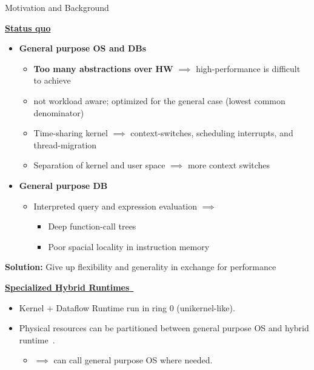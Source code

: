 \begin{block}{Motivation and Background}

\underline{\textbf{Status quo}}
  \begin{itemize}
  \item \textbf{General purpose OS and DBs}%
    \begin{itemize}
     \item \textbf{Too many abstractions over HW} $\implies$ high-performance is difficult
      to achieve~\cite{GICEVA:2016:OS_SUPPORT,HALE:2015:NAUTILUS}
    \item not workload aware; optimized for the general case (lowest common denominator)
    \item Time-sharing kernel $\implies$ context-switches, scheduling interrupts, and thread-migration
    \item Separation of kernel and user space $\implies$ more context switches
    \end{itemize}
  \item \textbf{General purpose DB}
    \begin{itemize}
    \item Interpreted query and expression evaluation  $\implies$
      \begin{itemize}
      \item Deep function-call trees
    \item Poor spacial locality in instruction memory
    \end{itemize}
    \end{itemize}
  \end{itemize}

  \begin{center}
    \alert{\textbf{Solution:} Give up flexibility and generality in exchange for performance}
  \end{center}
   
  \underline{\textbf{Specialized Hybrid Runtimes}~\cite{HALE:2015:NAUTILUS}}
    \begin{itemize}
    \item Kernel + Dataflow Runtime run in ring 0 (unikernel-like).
    \item Physical resources can be partitioned between general purpose OS and hybrid runtime~\cite{KOCOLOSKI:2015:PISCES}.
      \begin{itemize}
      \item $\implies$ can call general purpose OS where needed.
      \end{itemize}


\end{itemize}
\end{block}
